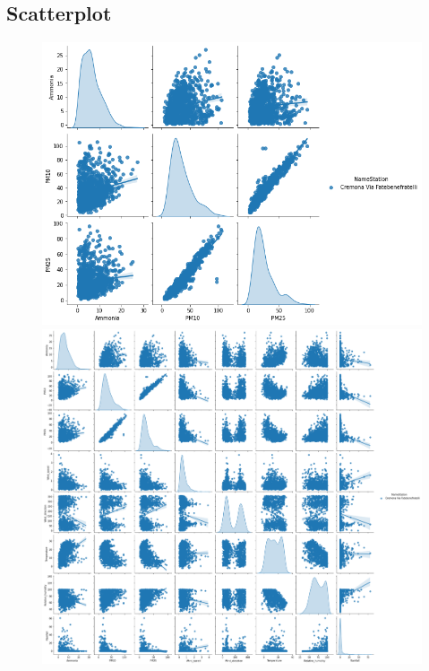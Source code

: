 \documentclass{article}
\begin{document}
\subsection{Scatterplot}
\begin{figure}[H]
  \centering
  \includegraphics[scale = 0.55]{Picture/Scatter/CremonaScatter.png}
  \includegraphics[scale = 0.3]{Picture/Scatter/CremonaScatterBig.png}
  \centering 
\end{figure}
\end{document}
